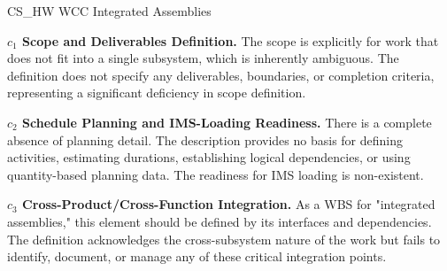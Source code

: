 %
\begin{frame}{CS\_HW WCC Integrated Assemblies}
\begin{minipage}{0.90\textwidth}
\raggedright
\fontsize{8}{9.5}\selectfont
\textbf{\(c_1\) Scope and Deliverables Definition.}
The scope is explicitly for work that does not fit into a single subsystem, which is inherently ambiguous. The definition does not specify any deliverables, boundaries, or completion criteria, representing a significant deficiency in scope definition.\par\vspace{0.6em}
\textbf{\(c_2\) Schedule Planning and IMS-Loading Readiness.}
There is a complete absence of planning detail. The description provides no basis for defining activities, estimating durations, establishing logical dependencies, or using quantity-based planning data. The readiness for IMS loading is non-existent.\par\vspace{0.6em}
\textbf{\(c_3\) Cross-Product/Cross-Function Integration.}
As a WBS for "integrated assemblies," this element should be defined by its interfaces and dependencies. The definition acknowledges the cross-subsystem nature of the work but fails to identify, document, or manage any of these critical integration points.\par\vspace{0.6em}
\end{minipage}
\end{frame}

\endinput
